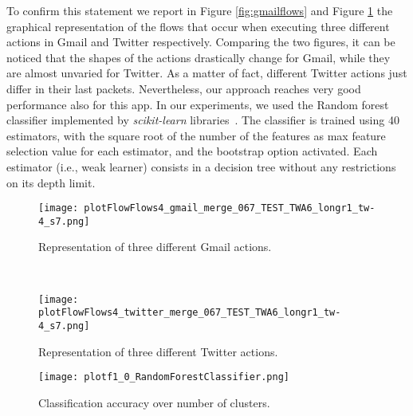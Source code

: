 \documentclass{acm_proc_article-sp}
\newcommand{\hilight}[1]{#1}
\begin{document}
  

To confirm this statement we report in 
Figure \ref{fig:gmailflows} and Figure \ref{fig:twitterflows} the 
graphical representation of the flows that occur when executing three different 
actions in Gmail and Twitter respectively. Comparing the two figures, it can be 
noticed that the shapes of the actions drastically change for Gmail, while they 
are almost unvaried for Twitter. As a matter of fact, different Twitter actions 
just differ in their last packets. Nevertheless, our approach 
reaches very good performance also for this app.
\hilight{In our experiments, we used the Random forest classifier implemented by \textit{scikit-learn} libraries}~\cite{scikitlearn}.
\hilight{The classifier is trained using 40 estimators, with the square root of the number of the features as max feature selection value for each estimator,
and the bootstrap option activated. Each estimator (i.e., weak learner) consists in a decision tree without any restrictions on its depth limit.}



\begin{figure} [h!]
        \centering
        \begin{minipage}[b]{0.45\textwidth}
                
\texttt{[image: plotFlowFlows4\_gmail\_merge\_067\_TEST\_TWA6\_longr1\_tw-4\_s7.png]}
    \caption{Representation of three different Gmail actions.}
    \label{fig:gmailflows}
        \end{minipage}\\
        \vspace{0.3cm}
\begin{minipage}[b]{0.45\textwidth}
\texttt{[image: plotFlowFlows4\_twitter\_merge\_067\_TEST\_TWA6\_longr1\_tw-4\_s7.png]}
    \caption{Representation of three different Twitter actions.}
    \label{fig:twitterflows}
        \end{minipage}
\end{figure}


\begin{figure}[h!]
    \centering
    \vspace{0.2cm}
\texttt{[image: plotf1\_0\_RandomForestClassifier.png]}
    \caption{Classification accuracy over number of clusters.}
    \label{fig:accuracyNClusters}
  \end{figure}
\end{document}
